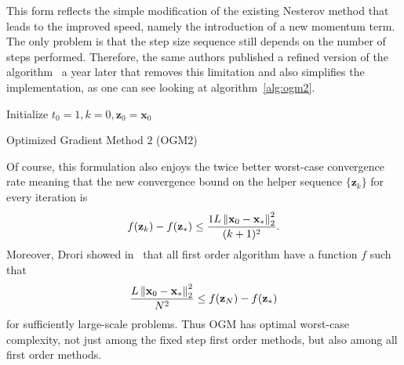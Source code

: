 This form reflects the simple modification of the existing Nesterov method that leads to the improved speed, namely the introduction of a new momentum term. The only problem is that the step size sequence still depends on the number of steps performed. Therefore, the same authors published a refined version of the algorithm~\cite{kim_convergence_2017} a year later that removes this limitation and also simplifies the implementation, as one can see looking at algorithm~\ref{alg:ogm2}.

\begin{algorithm}
    \BlankLine
    Initialize $t_0 = 1, k = 0, \mathbf{z}_0 = \mathbf{x}_0$\\
    \caption{Optimized Gradient Method 2 (OGM2)}
    \label{alg:ogm2}
\end{algorithm}

Of course, this formulation also enjoys the twice better worst-case convergence rate meaning that the new convergence bound on the helper sequence $\{\mathbf{z}_k\}$ for every iteration is
\[f(\mathbf{z}_k) - f(\mathbf{z}_*) \le \frac{1L\left\lVert\mathbf{x}_0 - \mathbf{x}_*\right\rVert_2^2}{(k+1)^2}.\]
Moreover, Drori showed in~\cite{drori_exact_2017} that all first order algorithm have a function $f$ such that
\[\frac{L\left\lVert\mathbf{x}_0 - \mathbf{x}_*\right\rVert_2^2}{N^2} \le f(\mathbf{z}_N) - f(\mathbf{z}_*)\]
for sufficiently large-scale problems. Thus OGM has optimal worst-case complexity, not just among the fixed step first order methods, but also among all first order methods.

